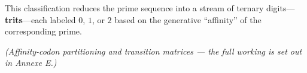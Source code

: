 This classification reduces the prime sequence into a stream of ternary digits—\textbf{trits}—each labeled \( 0 \), \( 1 \), or \( 2 \) based on the generative “affinity” of the corresponding prime.

\textit{(Affinity-codon partitioning and transition matrices --- the full working is set out in Annexe E.)}

% 
% 
% 
% 
% 
